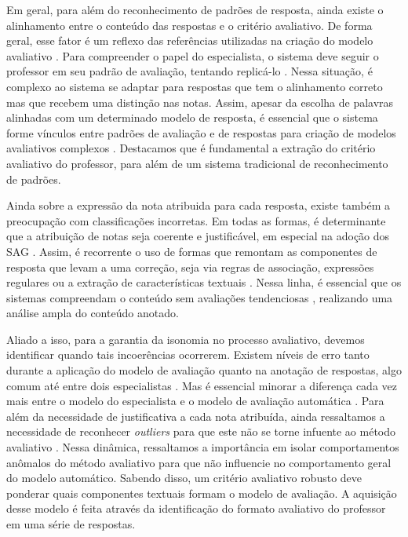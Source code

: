 Em geral, para além do reconhecimento de padrões de resposta, ainda existe o alinhamento entre o conteúdo das respostas e o critério avaliativo. De forma geral, esse fator é um reflexo das referências utilizadas na criação do modelo avaliativo \cite{krithika2015}. Para compreender o papel do especialista, o sistema deve seguir o professor em seu padrão de avaliação, tentando replicá-lo \cite{jordan2012, funayama2020}. Nessa situação, é complexo ao sistema se adaptar para respostas que tem o alinhamento correto mas que recebem uma distinção nas notas. Assim, apesar da escolha de palavras alinhadas com um determinado modelo de resposta, é essencial que o sistema forme vínculos entre padrões de avaliação e de respostas para criação de modelos avaliativos complexos \cite{higgins2014}. Destacamos que é fundamental a extração do critério avaliativo do professor, para além de um sistema tradicional de reconhecimento de padrões.

Ainda sobre a expressão da nota atribuida para cada resposta, existe também a preocupação com classificações incorretas. Em todas as formas, é determinante que a atribuição de notas seja coerente e justificável, em especial na adoção dos SAG \cite{funayama2020}. Assim, é recorrente o uso de formas que remontam as componentes de resposta que levam a uma correção, seja via regras de associação, expressões regulares ou a extração de características textuais \cite{chakraborty2017, kumar2019}. Nessa linha, é essencial que os sistemas compreendam o conteúdo sem avaliações tendenciosas \cite{azad2020}, realizando uma análise ampla do conteúdo anotado.

Aliado a isso, para a garantia da isonomia no processo avaliativo, devemos identificar quando tais incoerências ocorrerem. Existem níveis de erro tanto durante a aplicação do modelo de avaliação quanto na anotação de respostas, algo comum até entre dois especialistas \cite{artstein2008, pado2021}. Mas é essencial minorar a diferença cada vez mais entre o modelo do especialista e o modelo de avaliação automática \cite{condor2020}. Para além da necessidade de justificativa a cada nota atribuída, ainda ressaltamos a necessidade de reconhecer \textit{outliers} para que este não se torne infuente ao método avaliativo  \cite{ding2020}. Nessa dinâmica, ressaltamos a importância em isolar comportamentos anômalos do método avaliativo para que não influencie no comportamento geral do modelo automático. Sabendo disso, um critério avaliativo robusto deve ponderar quais componentes textuais formam o modelo de avaliação. A aquisição desse modelo é feita através da identificação do formato avaliativo do professor em uma série de respostas. 

